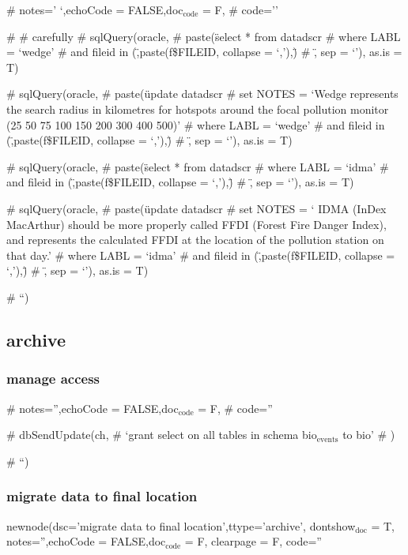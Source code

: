 \documentclass[a4paper]{article}
\begin{document}
  \# notes=' `,echoCode = FALSE,doc$_{\mathrm{code}}$ = F,
 \# code=''


 
 \# \# carefully
 \# sqlQuery(oracle, 
 \# paste(\"select * from datadscr 
 \# where LABL = `wedge'
 \# and fileid in (\",paste(f\$FILEID, collapse = `,'),\")
 \# \", sep = `'), as.is = T)
 
 \# sqlQuery(oracle, 
 \# paste(\"update datadscr 
 \# set NOTES = `Wedge represents the search radius in kilometres for hotspots around the focal pollution monitor (25  50  75 100 150 200 300 400 500)'
 \# where LABL = `wedge'
 \# and fileid in (\",paste(f\$FILEID, collapse = `,'),\")
 \# \", sep = `'), as.is = T)

 \# sqlQuery(oracle, 
 \# paste(\"select * from datadscr 
 \# where LABL = `idma'
 \# and fileid in (\",paste(f\$FILEID, collapse = `,'),\")
 \# \", sep = `'), as.is = T)
 
 \# sqlQuery(oracle, 
 \# paste(\"update datadscr 
 \# set NOTES = ` IDMA (InDex MacArthur) should be more properly called FFDI (Forest Fire Danger Index), and represents the calculated FFDI at the location of the pollution station on that day.'
 \# where LABL = `idma'
 \# and fileid in (\",paste(f\$FILEID, collapse = `,'),\")
 \# \", sep = `'), as.is = T)

 
 \# ``)
  
\subsection{archive}
\label{sec-10-9}
\subsubsection{manage access}
\label{sec-10-9-1}


 \# notes='',echoCode = FALSE,doc$_{\mathrm{code}}$ = F,
 \# code=''


 
 \# dbSendUpdate(ch,
 \# `grant select on all tables in schema bio$_{\mathrm{events}}$ to bio'
 \# )

 
 \# ``)
 
\subsubsection{migrate data to final location}
\label{sec-10-9-2}


newnode(dsc='migrate data to final location',ttype='archive',
 dontshow$_{\mathrm{doc}}$ = T, notes='',echoCode = FALSE,doc$_{\mathrm{code}}$ = F, clearpage = F,
 code=''
 
\end{document}
